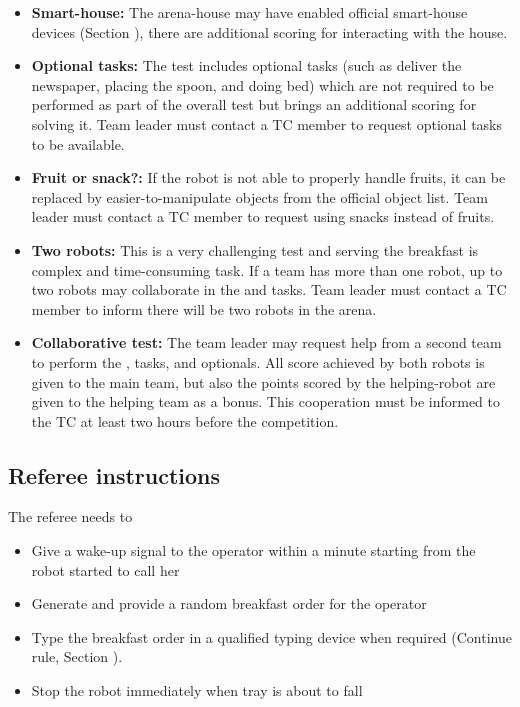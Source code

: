 \begin{itemize}
\item \textbf{Smart-house:} The arena-house may have enabled official smart-house devices (Section ), there are additional scoring for interacting with the house.

\item \textbf{Optional tasks:} The test includes optional tasks (such as deliver the newspaper, placing the spoon, and doing bed) which are not required to be performed as part of the overall test but brings an additional scoring for solving it. Team leader must contact a TC member to request optional tasks to be available.

\item \textbf{Fruit or snack?:} If the robot is not able to properly handle fruits, it can be replaced by easier-to-manipulate objects from the official object list. Team leader must contact a TC member to request using snacks instead of fruits.

\item \textbf{Two robots:} This is a very challenging test and serving the breakfast is complex and time-consuming task. If a team has more than one robot, up to two robots may collaborate in the  and  tasks. Team leader must contact a TC member to inform there will be two robots in the arena.

\item \textbf{Collaborative test:} The team leader may request help from a second team to perform the ,  tasks, and  optionals. All score achieved by both robots is given to the main team, but also the points scored by the helping-robot are given to the helping team as a bonus. This cooperation must be informed to the TC at least two hours before the competition.
\end{itemize}

\subsection{Referee instructions}

The referee needs to
\begin{itemize}
\item Give a wake-up signal to the operator within a minute starting from the robot started to call her
\item Generate and provide a random breakfast order for the operator
\item Type the breakfast order in a qualified typing device when required (Continue rule, Section ).
\item Stop the robot immediately when tray is about to fall
\end{itemize}

